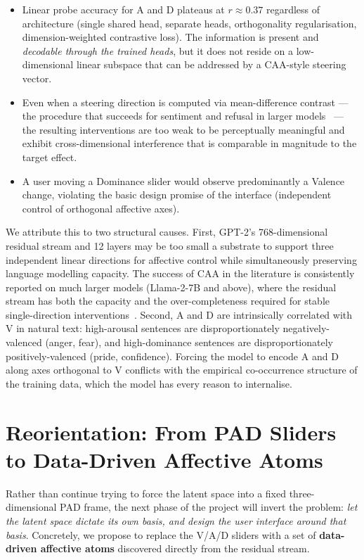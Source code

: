 \documentclass[12pt,twoside]{report}
\begin{document}
\begin{itemize}
    \item Linear probe accuracy for A and D plateaus at $r \approx 0.37$ regardless of architecture (single shared head, separate heads, orthogonality regularisation, dimension-weighted contrastive loss). The information is present and \emph{decodable through the trained heads}, but it does not reside on a low-dimensional linear subspace that can be addressed by a CAA-style steering vector.
    \item Even when a steering direction is computed via mean-difference contrast --- the procedure that succeeds for sentiment and refusal in larger models~\cite{caa, hollinsworth-etal-2024-language} --- the resulting interventions are too weak to be perceptually meaningful and exhibit cross-dimensional interference that is comparable in magnitude to the target effect.
    \item A user moving a Dominance slider would observe predominantly a Valence change, violating the basic design promise of the interface (independent control of orthogonal affective axes).
\end{itemize}

We attribute this to two structural causes.
First, GPT-2's 768-dimensional residual stream and 12 layers may be too small a substrate to support three independent linear directions for affective control while simultaneously preserving language modelling capacity.
The success of CAA in the literature is consistently reported on much larger models (Llama-2-7B and above), where the residual stream has both the capacity and the over-completeness required for stable single-direction interventions~\cite{caa, reichman2025emotionsartthouunderstanding}.
Second, A and D are intrinsically correlated with V in natural text: high-arousal sentences are disproportionately negatively-valenced (anger, fear), and high-dominance sentences are disproportionately positively-valenced (pride, confidence).
Forcing the model to encode A and D along axes orthogonal to V conflicts with the empirical co-occurrence structure of the training data, which the model has every reason to internalise.

\section{Reorientation: From PAD Sliders to Data-Driven Affective Atoms}
\label{sec:reorientation}

Rather than continue trying to force the latent space into a fixed three-dimensional PAD frame, the next phase of the project will invert the problem: \emph{let the latent space dictate its own basis, and design the user interface around that basis}.
Concretely, we propose to replace the V/A/D sliders with a set of \textbf{data-driven affective atoms} discovered directly from the residual stream.
\end{document}
